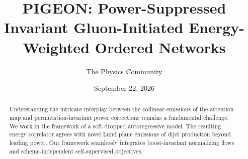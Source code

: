 \documentclass[11pt]{article}
\title{PIGEON: Power-Suppressed Invariant Gluon-Initiated Energy-Weighted Ordered Networks}
\author{The Physics Community}
\date{September 22, 2026}
\numberwithin{equation}{section}
\theoremstyle{definition}
\theoremstyle{remark}
\begin{document}
\maketitle
\begin{abstract}
Understanding the intricate interplay between the collinear emissions of
the attention map and permutation-invariant power corrections remains a
fundamental challenge. We work in the framework of a soft-dropped
autoregressive model. The resulting energy correlator agrees with novel
Lund plane emissions of dijet production beyond leading power. Our
framework seamlessly integrates boost-invariant normalizing flows and
scheme-independent self-supervised objectives.
\end{abstract}
\tableofcontents





\nocite{*}


\end{document}
